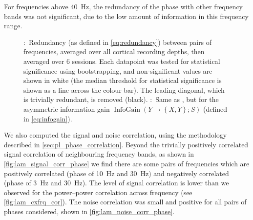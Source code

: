 For frequencies above \SI{40}{Hz}, the redundancy of the phase with other frequency bands was not significant, due to the low amount of information in this frequency range.

\begin{figure}[tbp]
\centering
\hspace*{\fill}
\hspace*{\fill}\hspace{.4cm}\hspace*{\fill}
\hspace*{\fill}
    \caption{
\protect{}:~Redundancy (as defined in \autoref{eq:redundancy}) between pairs of frequencies, averaged over all cortical recording depths, then averaged over \num{6} sessions.
Each datapoint was tested for statistical significance using bootstrapping, and non-significant values are shown in white (the median threshold for statistical significance is shown as a line across the colour bar).
The leading diagonal, which is trivially redundant, is removed (black).
\protect{}:~Same as \protect{}, but for the asymmetric information gain $\operatorname{InfoGain}\left(Y\to\left\{X,Y\right\};S\right)$ (defined in \autoref{eq:infogain}).
}
\label{fig:lam_phase_cxfrq_info}
\end{figure}


We also computed the signal and noise correlation, using the methodology described in \autoref{sec:pl_phase_correlation}.
Beyond the trivially positively correlated signal correlation of neighbouring frequency bands, as shown in \autoref{fig:lam_signal_corr_phase} we find there are some pairs of frequencies which are positively correlated (phase of \SI{10}{Hz} and \SI{30}{Hz}) and negatively correlated (phase of \SI{3}{Hz} and \SI{30}{Hz}).
The level of signal correlation is lower than we observed for the power--power correlation across frequency (see \autoref{fig:lam_cxfrq_cor}).
The noise correlation was small and positive for all pairs of phases considered, shown in \autoref{fig:lam_noise_corr_phase}.


